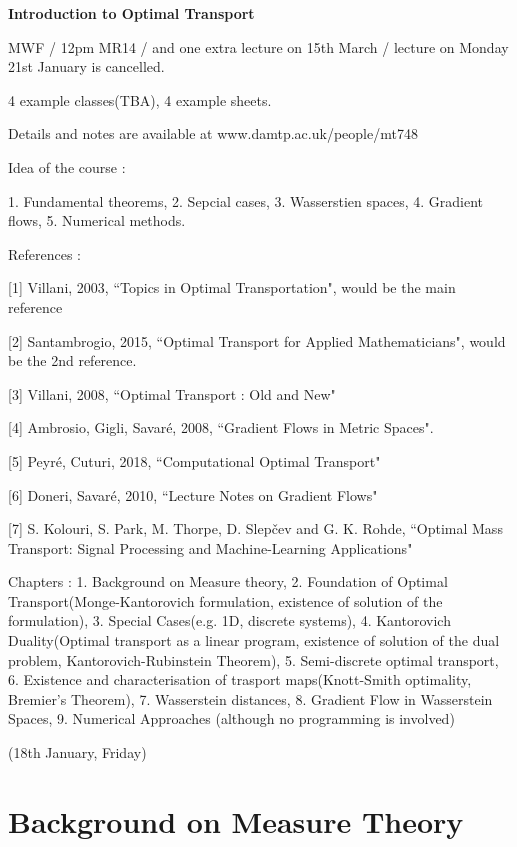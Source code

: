 \documentclass[12pt,a4paper]{article}
\begin{document}
\setlength\parindent{0pt}

\textbf{Introduction to Optimal Transport}

MWF / 12pm MR14 / and one extra lecture on 15th March / lecture on Monday 21st January is cancelled.

4 example classes(TBA), 4 example sheets.

Details and notes are available at www.damtp.ac.uk/people/mt748
\s

Idea of the course :

1. Fundamental theorems, 2. Sepcial cases, 3. Wasserstien spaces, 4. Gradient flows, 5. Numerical methods.
\s

References :

[1] Villani, 2003, ``Topics in Optimal Transportation", would be the main reference

[2] Santambrogio, 2015, ``Optimal Transport for Applied Mathematicians", would be the 2nd reference.

[3] Villani, 2008, ``Optimal Transport : Old and New"

[4] Ambrosio, Gigli, Savar\'{e}, 2008, ``Gradient Flows in Metric Spaces".

[5] Peyr\'{e}, Cuturi, 2018, ``Computational Optimal Transport"

[6] Doneri, Savar\'{e}, 2010, ``Lecture Notes on Gradient Flows"

[7] S. Kolouri, S. Park, M. Thorpe, D. Slepčev and G. K. Rohde, ``Optimal Mass Transport: Signal Processing and Machine-Learning Applications"
\s

Chapters : 1. Background on Measure theory, 2. Foundation of Optimal Transport(Monge-Kantorovich formulation, existence of solution of the formulation), 3. Special Cases(e.g. 1D, discrete systems), 4. Kantorovich Duality(Optimal transport as a linear program, existence of solution of the dual problem, Kantorovich-Rubinstein Theorem), 5. Semi-discrete optimal transport, 6. Existence and characterisation of trasport maps(Knott-Smith optimality, Bremier's Theorem), 7. Wasserstein distances, 8. Gradient Flow in Wasserstein Spaces, 9. Numerical Approaches (although no programming is involved)

\newday

(18th January, Friday)

\section{Background on Measure Theory}
\end{document}
